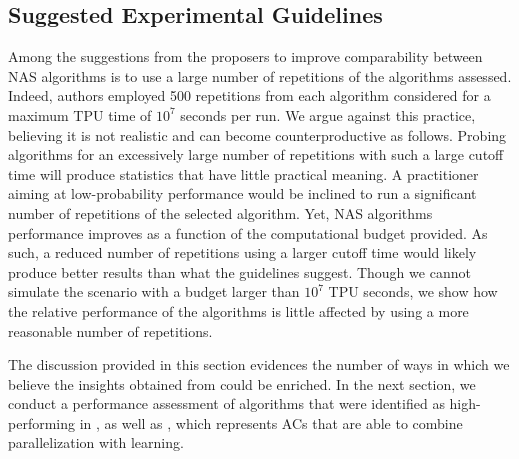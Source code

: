 \subsection{Suggested Experimental Guidelines}
Among the suggestions from the \nasbench proposers to improve comparability between NAS algorithms is to use a large number of repetitions of the algorithms assessed. Indeed, authors employed 500 repetitions from each algorithm considered for a maximum TPU time of $10^7$ seconds per run. We argue against this practice, believing it is not realistic and can become counterproductive as follows. Probing algorithms for an excessively large number of repetitions with such a large cutoff time will produce statistics that have little practical meaning.
A practitioner aiming at low-probability performance would be inclined to run a significant number of repetitions of the selected algorithm. Yet, NAS algorithms performance improves as a function of the computational budget provided. As such, a reduced number of repetitions using a larger cutoff time would likely produce better results than what the guidelines suggest. Though we cannot simulate the scenario with a budget larger than $10^7$ TPU seconds, we show how the relative performance of the algorithms is little affected by using a more reasonable number of repetitions.

\medskip
The discussion provided in this section evidences the number of ways in which we believe the insights obtained from \nasbench could be enriched. In the next section, we conduct a performance assessment of algorithms that were identified as high-performing in \nasbench, as well as \irace, which represents ACs that are able to combine parallelization with learning.